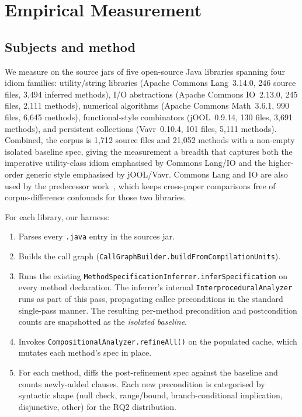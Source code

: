 \section{Empirical Measurement}
\label{sec:empirical}

\subsection{Subjects and method}

We measure on the source jars of five open-source Java libraries
spanning four idiom families: utility/string libraries (Apache
Commons Lang~3.14.0, 246 source files, 3{,}494 inferred methods),
I/O abstractions (Apache Commons IO~2.13.0, 245 files, 2{,}111
methods), numerical algorithms (Apache Commons Math~3.6.1, 990
files, 6{,}645 methods), functional-style combinators (jOOL~0.9.14,
130 files, 3{,}691 methods), and persistent collections (Vavr~0.10.4,
101 files, 5{,}111 methods). Combined, the corpus is 1{,}712 source
files and 21{,}052 methods with a non-empty isolated baseline spec,
giving the measurement a breadth that captures both the imperative
utility-class idiom emphasised by Commons Lang/IO and the
higher-order generic style emphasised by jOOL/Vavr. Commons Lang and
IO are also used by the predecessor work~\cite{edmonds2026inference,
edmonds2026embedding}, which keeps cross-paper comparisons free of
corpus-difference confounds for those two libraries.

For each library, our harness:

\begin{enumerate}\setlength\itemsep{0.2em}
  \item Parses every \texttt{.java} entry in the sources jar.
  \item Builds the call graph
        (\texttt{CallGraphBuilder.\allowbreak{}buildFromCompilationUnits}).
  \item Runs the existing
        \texttt{Method\allowbreak{}Specification\allowbreak{}Inferrer.\allowbreak{}infer\allowbreak{}Specification}
        on every method declaration. The inferrer's internal
        \texttt{InterproceduralAnalyzer} runs as part of this pass,
        propagating callee preconditions in the standard single-pass
        manner. The resulting per-method precondition and
        postcondition counts are snapshotted as the
        \emph{isolated baseline}.
  \item Invokes
        \texttt{CompositionalAnalyzer.\allowbreak{}refineAll()} on
        the populated cache, which mutates each method's spec in
        place.
  \item For each method, diffs the post-refinement spec against the
        baseline and counts newly-added clauses. Each new
        precondition is categorised by syntactic shape (null check,
        range/bound, branch-conditional implication, disjunctive,
        other) for the RQ2 distribution.
\end{enumerate}

